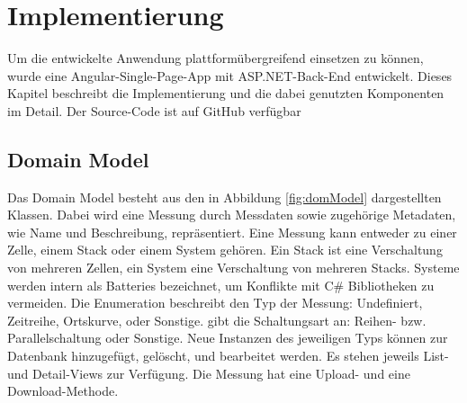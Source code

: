 \chapter{Implementierung}\label{ch:implementation}

Um die entwickelte Anwendung plattformübergreifend einsetzen zu können, wurde eine Angular-Single-Page-App mit ASP.NET-Back-End entwickelt. Dieses Kapitel beschreibt die Implementierung und die dabei genutzten Komponenten im Detail. Der Source-Code \cite{sourceCode} ist auf GitHub verfügbar

\section{Domain Model}

Das Domain Model besteht aus den in Abbildung \ref{fig:domModel} dargestellten Klassen. Dabei wird eine Messung durch Messdaten sowie zugehörige Metadaten, wie Name und Beschreibung, repräsentiert. Eine Messung kann entweder zu einer Zelle, einem Stack oder einem System gehören. Ein Stack ist eine Verschaltung von mehreren Zellen, ein System eine Verschaltung von mehreren Stacks. Systeme werden intern als Batteries bezeichnet, um Konflikte mit C\# Bibliotheken zu vermeiden. Die Enumeration  beschreibt den Typ der Messung: Undefiniert, Zeitreihe, Ortskurve, oder Sonstige.  gibt die Schaltungsart an: Reihen- bzw. Parallelschaltung oder Sonstige. Neue Instanzen des jeweiligen Typs können zur Datenbank hinzugefügt, gelöscht, und bearbeitet werden. Es stehen jeweils List- und Detail-Views zur Verfügung. Die Messung hat eine Upload- und eine Download-Methode.

